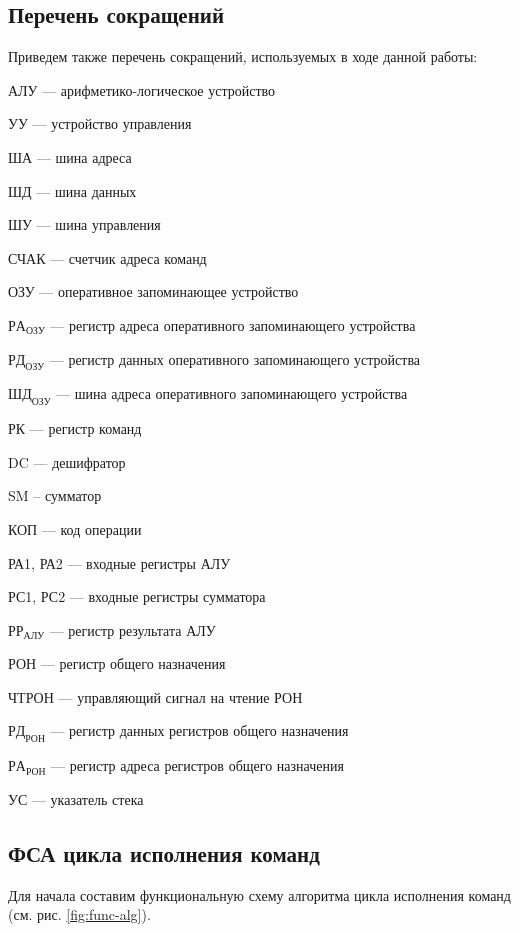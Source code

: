 \documentclass[a4paper,14pt]{extarticle}
\begin{document}
	
	\subsection{Перечень сокращений}
	Приведем также перечень сокращений, используемых в ходе данной работы:
	
	АЛУ --- арифметико-логическое устройство
	
	УУ --- устройство управления
	
	ША --- шина адреса
	
	ШД --- шина данных
	
	ШУ --- шина управления
	
	СЧАК --- счетчик адреса команд
	
	ОЗУ  --- оперативное запоминающее устройство
	
	$РА_{ОЗУ}$ --- регистр адреса оперативного запоминающего устройства
	
	$РД_{ОЗУ}$ --- регистр данных оперативного запоминающего устройства
	
	$ШД_{ОЗУ}$ --- шина адреса оперативного запоминающего устройства
	
	РК  --- регистр команд
	
	
	DC  --- дешифратор
	
	SM -- сумматор
	
	КОП --- код операции
	
	РА1, РА2 --- входные регистры АЛУ
	
	РС1, РС2 --- входные регистры сумматора
	
	$РР_{АЛУ}$ --- регистр результата АЛУ
	
	РОН --- регистр общего назначения
	
	ЧТРОН --- управляющий сигнал на чтение РОН
	
	$РД_{РОН}$  --- регистр данных регистров общего назначения
	
	$РА_{РОН}$  --- регистр адреса регистров общего назначения
	
	УС --- указатель стека
	
	
	\subsection{ФСА цикла исполнения команд}
	
	Для начала составим функциональную схему алгоритма цикла исполнения команд (см. рис. \ref{fig:func-alg}).
	
\end{document}
